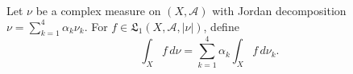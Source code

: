 Let $\nu$ be a complex measure on $(X, \mathcal{A})$ with Jordan decomposition $\nu = \sum_{k=1}^{4} \alpha_k \nu_k$. For $f \in \mathfrak{L}_1(X, \mathcal{A}, |\nu|)$, define
$$\int_X f \, d\nu = \sum_{k=1}^{4} \alpha_k \int_X f \, d\nu_k.$$
